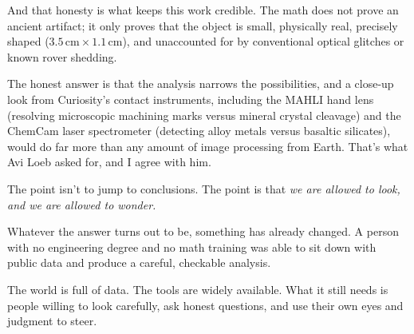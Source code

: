 \documentclass[11pt,a4paper]{article}
\begin{document}
And that honesty is what keeps this work credible. The math does not prove an ancient artifact; it only proves that the object is small, physically real, precisely shaped ($3.5\,\text{cm} \times 1.1\,\text{cm}$), and unaccounted for by conventional optical glitches or known rover shedding.

The honest answer is that the analysis narrows the possibilities, and a close-up look from Curiosity's contact instruments, including the MAHLI hand lens (resolving microscopic machining marks versus mineral crystal cleavage) and the ChemCam laser spectrometer (detecting alloy metals versus basaltic silicates), would do far more than any amount of image processing from Earth. That's what Avi Loeb asked for, and I agree with him.

The point isn't to jump to conclusions. The point is that \textit{we are allowed to look, and we are allowed to wonder.}

Whatever the answer turns out to be, something has already changed. A person with no engineering degree and no math training was able to sit down with public data and produce a careful, checkable analysis.

The world is full of data. The tools are widely available. What it still needs is people willing to look carefully, ask honest questions, and use their own eyes and judgment to steer.
\end{document}
